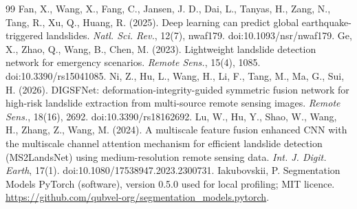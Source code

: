 \begin{thebibliography}{99}
 Fan, X., Wang, X., Fang, C., Jansen, J. D., Dai, L., Tanyas, H., Zang, N., Tang, R., Xu, Q., Huang, R. (2025). Deep learning can predict global earthquake-triggered landslides. \emph{Natl. Sci. Rev.}, 12(7), nwaf179. doi:10.1093/nsr/nwaf179.
 Ge, X., Zhao, Q., Wang, B., Chen, M. (2023). Lightweight landslide detection network for emergency scenarios. \emph{Remote Sens.}, 15(4), 1085. doi:10.3390/rs15041085.
 Ni, Z., Hu, L., Wang, H., Li, F., Tang, M., Ma, G., Sui, H. (2026). DIGSFNet: deformation-integrity-guided symmetric fusion network for high-risk landslide extraction from multi-source remote sensing images. \emph{Remote Sens.}, 18(16), 2692. doi:10.3390/rs18162692.
 Lu, W., Hu, Y., Shao, W., Wang, H., Zhang, Z., Wang, M. (2024). A multiscale feature fusion enhanced CNN with the multiscale channel attention mechanism for efficient landslide detection (MS2LandsNet) using medium-resolution remote sensing data. \emph{Int. J. Digit. Earth}, 17(1). doi:10.1080/17538947.2023.2300731.
 Iakubovskii, P. Segmentation Models PyTorch (software), version 0.5.0 used for local profiling; MIT licence. \url{https://github.com/qubvel-org/segmentation_models.pytorch}.
\end{thebibliography}
